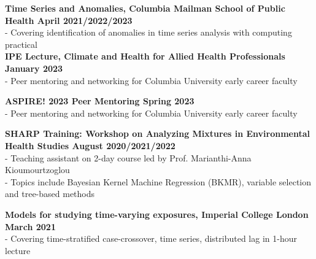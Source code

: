 \noindent \textbf{Time Series and Anomalies, Columbia Mailman School of Public Health \hfill April 2021/2022/2023}\\
\noindent - Covering identification of anomalies in time series analysis with computing practical\\


\noindent \textbf{IPE Lecture, Climate and Health for Allied Health Professionals \hfill January 2023}\\
\noindent - Peer mentoring and networking for Columbia University early career faculty
\bigskip

\noindent \textbf{ASPIRE! 2023 Peer Mentoring \hfill Spring 2023}\\
\noindent - Peer mentoring and networking for Columbia University early career faculty
\bigskip

\noindent \textbf{SHARP Training: Workshop on Analyzing Mixtures in Environmental Health Studies \hfill August 2020/2021/2022}\\
\noindent - Teaching assistant on 2-day course led by Prof. Marianthi-Anna Kioumourtzoglou\\
\noindent - Topics include Bayesian Kernel Machine Regression (BKMR), variable selection and tree-based methods \bigskip


\noindent \textbf{Models for studying time-varying exposures, Imperial College London \hfill March 2021}\\
\noindent - Covering time-stratified case-crossover, time series, distributed lag in 1-hour lecture
\bigskip



